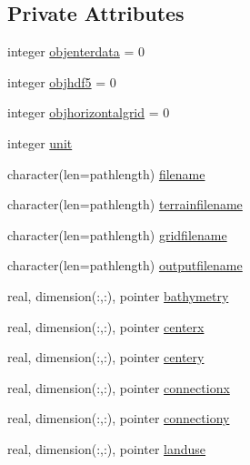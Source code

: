 \subsection*{Private Attributes}
\begin{DoxyCompactItemize}
\item 
integer \mbox{\hyperlink{structmodulemm5format_1_1t__mm5format_a3c3d99c08163f7ca7234fc5aa785e98c}{objenterdata}} = 0
\item 
integer \mbox{\hyperlink{structmodulemm5format_1_1t__mm5format_a81faca12150753f74c788fd6a6716dbc}{objhdf5}} = 0
\item 
integer \mbox{\hyperlink{structmodulemm5format_1_1t__mm5format_a939e4ba591ce45ef73598bb22ceaf838}{objhorizontalgrid}} = 0
\item 
integer \mbox{\hyperlink{structmodulemm5format_1_1t__mm5format_a62c71e62accb485a87d858ba37d354d1}{unit}}
\item 
character(len=pathlength) \mbox{\hyperlink{structmodulemm5format_1_1t__mm5format_a18a5157ae17df8fcfa932dca6c602b8b}{filename}}
\item 
character(len=pathlength) \mbox{\hyperlink{structmodulemm5format_1_1t__mm5format_a99250caf9d98b56d17301dbc9b3fc953}{terrainfilename}}
\item 
character(len=pathlength) \mbox{\hyperlink{structmodulemm5format_1_1t__mm5format_a48060a842abe6f931b24613d1be33216}{gridfilename}}
\item 
character(len=pathlength) \mbox{\hyperlink{structmodulemm5format_1_1t__mm5format_a80a213b1b7fd6440270ba664f4dbd2af}{outputfilename}}
\item 
real, dimension(\+:,\+:), pointer \mbox{\hyperlink{structmodulemm5format_1_1t__mm5format_ac0fb56b56edefc926b0cc0edf98e5447}{bathymetry}}
\item 
real, dimension(\+:,\+:), pointer \mbox{\hyperlink{structmodulemm5format_1_1t__mm5format_a79fc06b77d570d117f2e645ebc096bb5}{centerx}}
\item 
real, dimension(\+:,\+:), pointer \mbox{\hyperlink{structmodulemm5format_1_1t__mm5format_aececb28b1e4dfa7d11fbf8e1af5f8629}{centery}}
\item 
real, dimension(\+:,\+:), pointer \mbox{\hyperlink{structmodulemm5format_1_1t__mm5format_a8179528572375aa13696cb695414c0f9}{connectionx}}
\item 
real, dimension(\+:,\+:), pointer \mbox{\hyperlink{structmodulemm5format_1_1t__mm5format_a0208052cc9cb1ce7b35d5a45c61454f5}{connectiony}}
\item 
real, dimension(\+:,\+:), pointer \mbox{\hyperlink{structmodulemm5format_1_1t__mm5format_a338bdd593f2c32b75af38f124a8ba468}{landuse}}

\end{DoxyCompactItemize}
